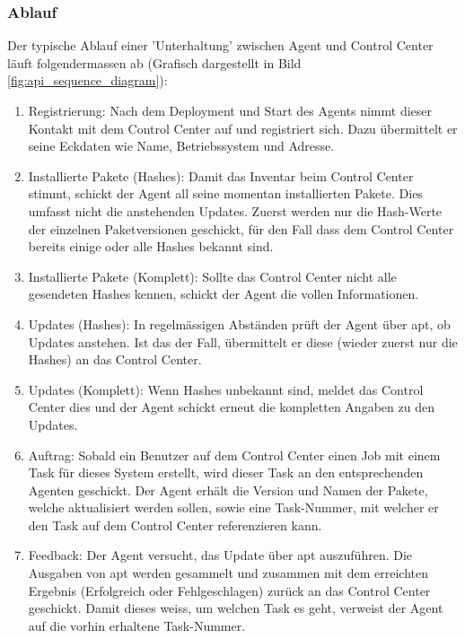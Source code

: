 \subsubsection*{Ablauf}

Der typische Ablauf einer 'Unterhaltung' zwischen Agent und Control Center läuft folgendermassen ab (Grafisch dargestellt in Bild \ref{fig:api_sequence_diagram}):

\begin{enumerate}
    \item Registrierung: Nach dem Deployment und Start des Agents nimmt dieser Kontakt mit dem Control Center auf und registriert sich. Dazu übermittelt er seine Eckdaten wie Name, Betriebssystem und Adresse.
    \item Installierte Pakete (Hashes): Damit das Inventar beim Control Center stimmt, schickt der Agent all seine momentan installierten Pakete. Dies umfasst nicht die anstehenden Updates. Zuerst werden nur die Hash-Werte der einzelnen Paketversionen geschickt, für den Fall dass dem Control Center bereits einige oder alle Hashes bekannt sind.
    \item Installierte Pakete (Komplett): Sollte das Control Center nicht alle gesendeten Hashes kennen, schickt der Agent die vollen Informationen.
    \item Updates (Hashes): In regelmässigen Abständen prüft der Agent über \gls{apt}, ob Updates anstehen. Ist das der Fall, übermittelt er diese (wieder zuerst nur die Hashes) an das Control Center.
    \item Updates (Komplett): Wenn Hashes unbekannt sind, meldet das Control Center dies und der Agent schickt erneut die kompletten Angaben zu den Updates.
    \item Auftrag: Sobald ein Benutzer auf dem Control Center einen Job mit einem Task für dieses System erstellt, wird dieser Task an den entsprechenden Agenten geschickt. Der Agent erhält die Version und Namen der Pakete, welche aktualisiert werden sollen, sowie eine Task-Nummer, mit welcher er den Task auf dem Control Center referenzieren kann.
    \item Feedback: Der Agent versucht, das Update über \gls{apt} auszuführen. Die Ausgaben von apt werden gesammelt und zusammen mit dem erreichten Ergebnis (Erfolgreich oder Fehlgeschlagen) zurück an das Control Center geschickt. Damit dieses weiss, um welchen Task es geht, verweist der Agent auf die vorhin erhaltene Task-Nummer.
\end{enumerate}

